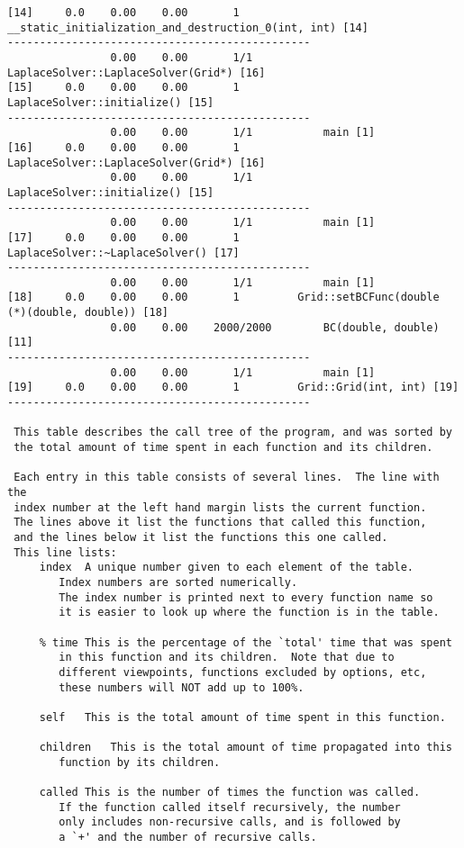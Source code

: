 \documentclass[a4paper,twosidep]{article}
\begin{document}
\begin{verbatim}
[14]     0.0    0.00    0.00       1         __static_initialization_and_destruction_0(int, int) [14]
-----------------------------------------------
                0.00    0.00       1/1           LaplaceSolver::LaplaceSolver(Grid*) [16]
[15]     0.0    0.00    0.00       1         LaplaceSolver::initialize() [15]
-----------------------------------------------
                0.00    0.00       1/1           main [1]
[16]     0.0    0.00    0.00       1         LaplaceSolver::LaplaceSolver(Grid*) [16]
                0.00    0.00       1/1           LaplaceSolver::initialize() [15]
-----------------------------------------------
                0.00    0.00       1/1           main [1]
[17]     0.0    0.00    0.00       1         LaplaceSolver::~LaplaceSolver() [17]
-----------------------------------------------
                0.00    0.00       1/1           main [1]
[18]     0.0    0.00    0.00       1         Grid::setBCFunc(double (*)(double, double)) [18]
                0.00    0.00    2000/2000        BC(double, double) [11]
-----------------------------------------------
                0.00    0.00       1/1           main [1]
[19]     0.0    0.00    0.00       1         Grid::Grid(int, int) [19]
-----------------------------------------------

 This table describes the call tree of the program, and was sorted by
 the total amount of time spent in each function and its children.

 Each entry in this table consists of several lines.  The line with the
 index number at the left hand margin lists the current function.
 The lines above it list the functions that called this function,
 and the lines below it list the functions this one called.
 This line lists:
     index	A unique number given to each element of the table.
		Index numbers are sorted numerically.
		The index number is printed next to every function name so
		it is easier to look up where the function is in the table.

     % time	This is the percentage of the `total' time that was spent
		in this function and its children.  Note that due to
		different viewpoints, functions excluded by options, etc,
		these numbers will NOT add up to 100%.

     self	This is the total amount of time spent in this function.

     children	This is the total amount of time propagated into this
		function by its children.

     called	This is the number of times the function was called.
		If the function called itself recursively, the number
		only includes non-recursive calls, and is followed by
		a `+' and the number of recursive calls.


\end{verbatim}
\end{document}
